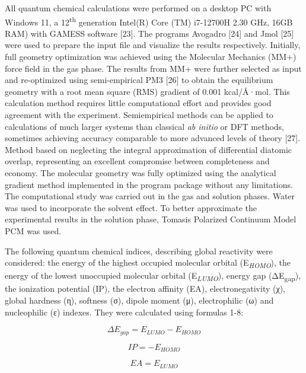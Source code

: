 \begin{multicols}{2}
All quantum chemical calculations were performed on a desktop PC with
Windows 11, a 12\textsuperscript{th} generation Intel(R) Core (TM)
i7-12700H 2.30 GHz, 16GB RAM) with GAMESS software {[}23{]}. The
programs Avogadro {[}24{]} and Jmol {[}25{]} were used to prepare the
input file and visualize the results respectively. Initially, full
geometry optimization was achieved using the Molecular Mechanics (MM+)
force field in the gas phase. The results from MM+ were further selected
as input and re-optimized using semi-empirical PM3 {[}26{]} to obtain
the equilibrium geometry with a root mean square (RMS) gradient of 0.001
kcal/Å·mol. This calculation method requires little computational effort
and provides good agreement with the experiment. Semiempirical methods
can be applied to calculations of much larger systems than classical
\emph{ab initio} or DFT methods, sometimes achieving accuracy comparable
to more advanced levels of theory {[}27{]}. Method based on neglecting
the integral approximation of differential diatomic overlap,
representing an excellent compromise between completeness and economy.
The molecular geometry was fully optimized using the analytical gradient
method implemented in the program package without any limitations. The
computational study was carried out in the gas and solution phases.
Water was used to incorporate the solvent effect. To better approximate
the experimental results in the solution phase, Tomasi\textquotesingle s
Polarized Continuum Model PCM was used.

The following quantum chemical indices, describing global reactivity
were considered: the energy of the highest occupied molecular orbital
(E\emph{\textsubscript{HOMO}}), the energy of the lowest unoccupied
molecular orbital (E\emph{\textsubscript{LUMO}}), energy gap
(ΔE\textsubscript{gap}), the ionization potential (IP), the electron
affinity (EA), electronegativity (χ), global hardness (η), softness (σ),
dipole moment (μ), electrophilic (ω) and nucleophilic (ε) indexes. They
were calculated using formulas 1-8:

\begin{equation}
    \Delta E_{gap}=E_{LUMO}-E_{HOMO}
\end{equation}

\begin{equation}
    IP=-E_{HOMO}
\end{equation}

\begin{equation}
    EA=  E_{LUMO}
\end{equation}


\end{multicols}
